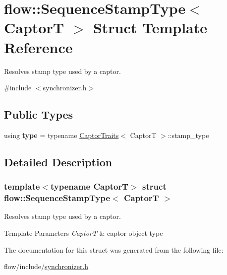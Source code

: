 \hypertarget{structflow_1_1_sequence_stamp_type}{}\section{flow\+:\+:Sequence\+Stamp\+Type$<$ CaptorT $>$ Struct Template Reference}
\label{structflow_1_1_sequence_stamp_type}


Resolves stamp type used by a captor.  




{\ttfamily \#include $<$synchronizer.\+h$>$}

\subsection*{Public Types}
\begin{DoxyCompactItemize}
\item 
\mbox{\label{structflow_1_1_sequence_stamp_type_a7413290adf7bfe0fde606db2e7068784}} 
using {\bfseries type} = typename \hyperlink{structflow_1_1_captor_traits}{Captor\+Traits}$<$ CaptorT $>$\+::stamp\+\_\+type
\end{DoxyCompactItemize}


\subsection{Detailed Description}
\subsubsection*{template$<$typename CaptorT$>$\newline
struct flow\+::\+Sequence\+Stamp\+Type$<$ Captor\+T $>$}

Resolves stamp type used by a captor. 


\begin{DoxyTemplParams}{Template Parameters}
{\em CaptorT} & captor object type \\
\hline
\end{DoxyTemplParams}


The documentation for this struct was generated from the following file\+:\begin{DoxyCompactItemize}
\item 
flow/include/\hyperlink{synchronizer_8h}{synchronizer.\+h}\end{DoxyCompactItemize}
